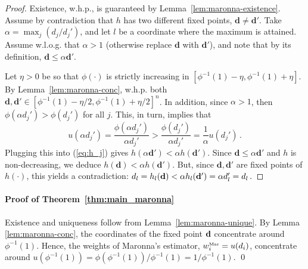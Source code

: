 \documentclass[times,sort&compress,3p]{elsarticle}
\begin{document}
\begin{proof}
        Existence, w.h.p., is guaranteed by Lemma~\ref{lem:maronna-existence}. Assume by contradiction that $h$ has two different fixed points, $\mathbf{d} \ne \mathbf{d}'$. Take $\alpha = \max_{j} (d_j/d_j')$, and let $l$ be a coordinate where the maximum is attained. Assume w.l.o.g. that $\alpha>1$ 
(otherwise replace  $\mathbf{d}$ with $\mathbf{d}'$), and note that by its definition, $\mathbf{d}\leq \alpha\mathbf{d}'$.       


        Let $\eta>0$ be so that $\phi(\cdot)$ is strictly increasing in $[\phi^{-1}(1)-\eta,\phi^{-1}(1)+\eta]$. 
By Lemma~\ref{lem:maronna-conc}, w.h.p. both $\mathbf{d},\mathbf{d}' \in [\phi^{-1}(1)-\eta/2,\phi^{-1}(1)+\eta/2]^n$. In addition, since $\alpha>1$, then
$\phi(\alpha d_j') > \phi(d_j')$ for all $j$. This, in turn, implies that
\[
u(\alpha d_j')=\frac{\phi(\alpha d_j')}{\alpha d_j'} >\frac{\phi(d_j')}{\alpha d_j'} = \frac1\alpha u(d_j')\,.
\]
Plugging this into (\ref{eq:h_j}) gives $h(\alpha \bm{d}')<\alpha h(\bm{d}')$.  
  Since $\mathbf{d}\leq \alpha\mathbf{d}'$ and $h$ is non-decreasing, we deduce $h(\bm{d}) < \alpha h(\bm{d}')$. 
  But, since $\mathbf{d},\mathbf{d}'$ are fixed points of $h(\cdot)$, this yields a contradiction:
        $
        d_l = h_l({\bf d}) < \alpha h_l(\mathbf{d}') = \alpha d_l' = d_l \,.
        $
\end{proof}

\paragraph{Proof of Theorem~\ref{thm:main_maronna}} Existence and uniqueness follow from Lemma~\ref{lem:maronna-unique}.
By Lemma \ref{lem:maronna-conc}, the coordinates of the fixed point ${\bf d}$ concentrate around $\phi^{-1}(1)$. Hence, the weights of Maronna's estimator, $w^{\mbox{\tiny{Mar}}}_i=u(d_i)$, concentrate around $u(\phi^{-1}(1))=\phi(\phi^{-1}(1))/\phi^{-1}(1)=1/\phi^{-1}(1)$.
\qed
 
\end{document}
